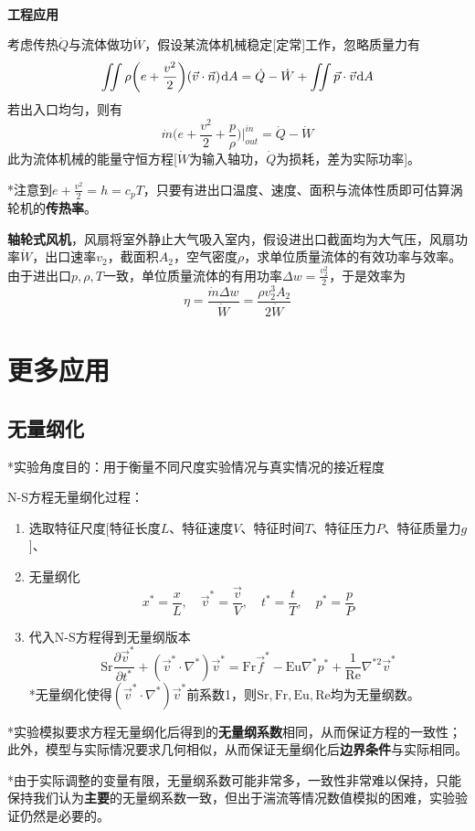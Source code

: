 \documentclass[a4paper,UTF8,fontset=windows]{ctexart}
\newcommand*{\dr}{\hspace{0.07em}\mathrm{d}}
\begin{document}
\

\textbf{工程应用}

考虑传热$\dot{Q}$与流体做功$\dot{W}$，假设某流体机械稳定[定常]工作，忽略质量力有
$$\iint\rho\bigg(e+\frac{v^2}{2}\bigg)(\vec{v}\cdot\vec{n})\dr A=\dot{Q}-\dot{W}+\iint\vec{p}\cdot\vec{v}\dr A$$
若出入口均匀，则有
$$\dot{m}\bigg(e+\frac{v^2}{2}+\frac{p}{\rho}\bigg)\bigg|^{in}_{out}=\dot{Q}-\dot{W}$$
此为流体机械的能量守恒方程[$\dot{W}$为输入轴功，$\dot{Q}$为损耗，差为实际功率]。

*注意到$e+\frac{v^2}{2}=h=c_pT$，只要有进出口温度、速度、面积与流体性质即可估算涡轮机的\textbf{传热率}。

\textbf{轴轮式风机}，风扇将室外静止大气吸入室内，假设进出口截面均为大气压，风扇功率$\dot{W}$，出口速率$v_2$，截面积$A_2$，空气密度$\rho$，求单位质量流体的有效功率与效率。由于进出口$p,\rho,T$一致，单位质量流体的有用功率$\Delta w=\frac{v_2^2}{2}$，于是效率为
$$\eta=\frac{\dot{m}\Delta w}{\dot{W}}=\frac{\rho v_2^3A_2}{2\dot{W}}$$

\section{更多应用}
\subsection{无量纲化}
*实验角度目的：用于衡量不同尺度实验情况与真实情况的接近程度

N-S方程无量纲化过程：
\begin{enumerate}
    \item 选取特征尺度[特征长度$L$、特征速度$V$、特征时间$T$、特征压力$P$、特征质量力$g$]、
    \item 无量纲化
    $$x^*=\frac{x}{L},\quad \vec{v}^*=\frac{\vec{v}}{V},\quad t^*=\frac{t}{T},\quad p^*=\frac{p}{P}$$
    \item 代入N-S方程得到无量纲版本
    $$\mathrm{Sr}\frac{\partial \vec{v}^*}{\partial t^*}+(\vec{v}^*\cdot\nabla^*)\vec{v}^*=\mathrm{Fr}\vec{f}^*-\mathrm{Eu}\nabla^*p^*+\frac{1}{\mathrm{Re}}\nabla^{*2}\vec{v}^*$$
    *无量纲化使得$(\vec{v}^*\cdot\nabla^*)\vec{v}^*$前系数1，则$\mathrm{Sr},\mathrm{Fr},\mathrm{Eu},\mathrm{Re}$均为无量纲数。
\end{enumerate}

*实验模拟要求方程无量纲化后得到的\textbf{无量纲系数}相同，从而保证方程的一致性；此外，模型与实际情况要求几何相似，从而保证无量纲化后\textbf{边界条件}与实际相同。

*由于实际调整的变量有限，无量纲系数可能非常多，一致性非常难以保持，只能保持我们认为\textbf{主要}的无量纲系数一致，但出于湍流等情况数值模拟的困难，实验验证仍然是必要的。
\end{document}

